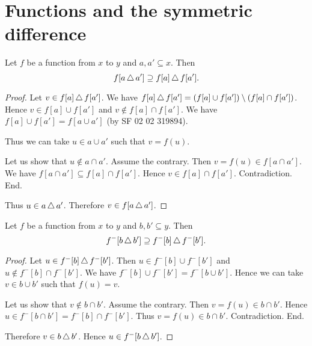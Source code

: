 \documentclass[../../sets-and-functions.ftl.tex]{subfiles}
\begin{document}
  \section{Functions and the symmetric difference}

  \begin{forthel}
    \begin{proposition}[SF 02 04 657921]
      Let $f$ be a function from $x$ to $y$ and $a,a' \subseteq x$.
      Then \[ f[a \mathop{\triangle} a'] \supseteq f[a] \mathop{\triangle} f[a']. \]
    \end{proposition}
    \begin{proof}
      Let $v \in f[a] \mathop{\triangle} f[a']$.
      We have $f[a] \mathop{\triangle} f[a'] = (f[a] \cup f[a']) \setminus (f[a] \cap f[a'])$.
      Hence $v \in f[a] \cup f[a']$ and $v \notin f[a] \cap f[a']$.
      We have $f[a] \cup f[a'] = f[a \cup a']$ (by SF 02 02 319894).

      Thus we can take $u \in a \cup a'$ such that $v = f(u)$.

      Let us show that $u \notin a \cap a'$.
        Assume the contrary.
        Then $v = f(u) \in f[a \cap a']$.
        We have $f[a \cap a'] \subseteq f[a] \cap f[a']$.
        Hence $v \in f[a] \cap f[a']$.
        Contradiction.
      End.

      Thus $u \in a \mathop{\triangle} a'$.
      Therefore $v \in f[a \mathop{\triangle} a']$.
    \end{proof}


    \begin{proposition}[SF 02 04 661750]
      Let $f$ be a function from $x$ to $y$ and $b,b' \subseteq y$.
      Then \[ f^{-}[b \mathop{\triangle} b'] \supseteq f^{-}[b] \mathop{\triangle} f^{-}[b']. \]
    \end{proposition}
    \begin{proof}
      Let $u \in f^{-}[b] \mathop{\triangle} f^{-}[b']$.
      Then $u \in f^{-}[b] \cup f^{-}[b']$ and $u \notin f^{-}[b] \cap f^{-}[b']$.
      We have $f^{-}[b] \cup f^{-}[b'] = f^{-}[b \cup b']$.
      Hence we can take $v \in b \cup b'$ such that $f(u) = v$.

      Let us show that $v \notin b \cap b'$.
        Assume the contrary.
        Then $v = f(u) \in b \cap b'$.
        Hence $u \in f^{-}[b \cap b'] = f^{-}[b] \cap f^{-}[b']$.
        Thus $v = f(u) \in b \cap b'$.
        Contradiction.
      End.

      Therefore $v \in b \mathop{\triangle} b'$.
      Hence $u \in f^{-}[b \mathop{\triangle} b']$.
    \end{proof}
  \end{forthel}
\end{document}
